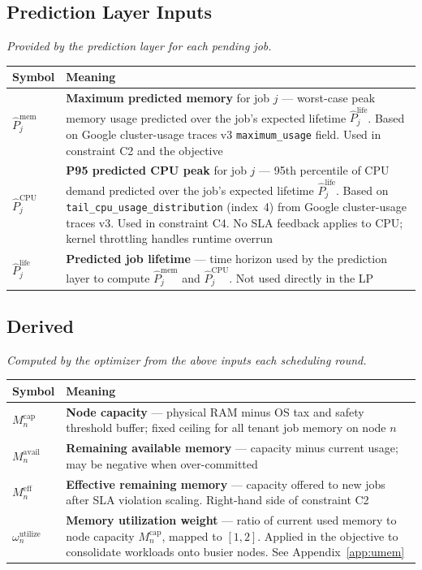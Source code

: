 \documentclass[11pt]{article}
\newcommand{\Meff}{M_n^{\text{eff}}}
\newcommand{\Mcap}{M_n^{\text{cap}}}
\newcommand{\Mavail}{M_n^{\text{avail}}}
\newcommand{\omutilize}{\omega_n^{\text{utilize}}}
\newcommand{\Pmem}{\hat{P}_j^{\text{mem}}}
\newcommand{\Pcpu}{\hat{P}_j^{\text{CPU}}}
\newcommand{\Plife}{\hat{P}_j^{\text{life}}}
\begin{document}
\subsection*{Prediction Layer Inputs}
\textit{Provided by the prediction layer for each pending job.}

\medskip
\begin{center}
\begin{tabular}{@{}l p{10.5cm}@{}}
\toprule
Symbol & Meaning \\
\midrule
$\Pmem$  & \textbf{Maximum predicted memory} for job $j$ --- worst-case peak
  memory usage predicted over the job's expected lifetime $\Plife$.
  Based on Google cluster-usage traces v3 \texttt{maximum\_usage} field.
  Used in constraint C2 and the objective \\[6pt]
$\Pcpu$  & \textbf{P95 predicted CPU peak} for job $j$ --- 95th percentile of
  CPU demand predicted over the job's expected lifetime $\Plife$.
  Based on \texttt{tail\_cpu\_usage\_distribution} (index~4) from Google
  cluster-usage traces v3. Used in constraint C4. No SLA feedback applies to
  CPU; kernel throttling handles runtime overrun \\[6pt]
$\Plife$ & \textbf{Predicted job lifetime} --- time horizon used by the
  prediction layer to compute $\Pmem$ and $\Pcpu$.
  Not used directly in the LP \\
\bottomrule
\end{tabular}
\end{center}

\subsection*{Derived}
\textit{Computed by the optimizer from the above inputs each scheduling round.}

\medskip
\begin{center}
\begin{tabular}{@{}l p{10.5cm}@{}}
\toprule
Symbol & Meaning \\
\midrule
$\Mcap$  & \textbf{Node capacity} --- physical RAM minus OS tax and safety
  threshold buffer; fixed ceiling for all tenant job memory on node $n$ \\[6pt]
$\Mavail$ & \textbf{Remaining available memory} --- capacity minus current
  usage; may be negative when over-committed \\[6pt]
$\Meff$  & \textbf{Effective remaining memory} --- capacity offered to new
  jobs after SLA violation scaling. Right-hand side of constraint C2 \\[6pt]
$\omutilize$  & \textbf{Memory utilization weight} --- ratio of current used memory
  to node capacity $\Mcap$, mapped to $[1,2]$. Applied in the objective to
  consolidate workloads onto busier nodes.
  See Appendix~\ref{app:umem} \\
\bottomrule
\end{tabular}
\end{center}
\end{document}
